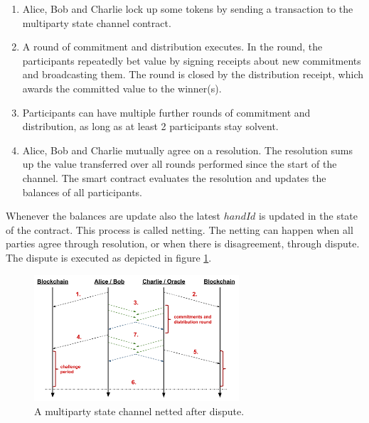 \begin{enumerate}
\item Alice, Bob and Charlie lock up some tokens by sending a transaction to the multiparty state channel contract.
\item A round of commitment and distribution executes. In the round, the participants repeatedly bet value by signing receipts about new commitments and broadcasting them. The round is  closed by the distribution receipt, which awards the committed value to the winner(s).
\item Participants can have multiple further rounds of commitment and distribution, as long as at least 2 participants stay solvent.
\item Alice, Bob and Charlie mutually agree on a resolution. The resolution sums up the value transferred over all rounds performed since the start of the channel. The smart contract evaluates the resolution and updates the balances of all participants. 
\end{enumerate}

Whenever the balances are update also the latest \(handId\) is updated in the state of the contract. This process is called netting. The netting can happen when all parties agree through resolution, or when there is disagreement, through dispute. The dispute is executed as depicted in figure \ref{mpc_dispute}.

\begin{figure}[!ht]
\centering
\includegraphics[width=3.0in]{images/multiDispute.png}
\caption{A multiparty state channel netted after dispute.}
\label{mpc_dispute}
\end{figure}

